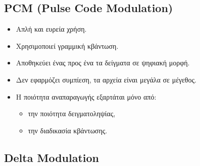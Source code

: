 \documentclass[a4paper,12pt]{article}
\begin{document}
\subsection{PCM (Pulse Code Modulation)}
\begin{itemize}
    \item Απλή και ευρεία χρήση.
    \item Χρησιμοποιεί γραμμική κβάντωση.
    \item Αποθηκεύει ένας προς ένα τα δείγματα σε ψηφιακή μορφή.
    \item Δεν εφαρμόζει συμπίεση, τα αρχεία είναι μεγάλα σε μέγεθος.
    \item Η ποιότητα αναπαραγωγής εξαρτάται μόνο από:
    \begin{itemize}
        \item την ποιότητα δειγματοληψίας,
        \item την διαδικασία κβάντωσης.
    \end{itemize}
\end{itemize}
\subsection{Delta Modulation}
\end{document}
